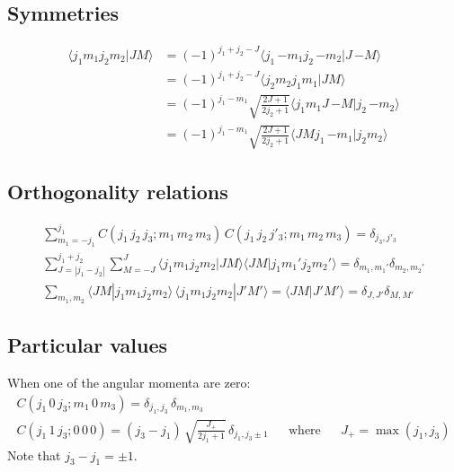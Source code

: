 \subsection{Symmetries}
\label{S:C-G-symm}

\begin{subequations}
  \begin{align}
    \langle j_1 m_1 j_2 m_2|J M\rangle
    \label{Q:C-G-symmetries-1} & = (-1)^{j_1+j_2-J} \langle j_1\, {-m_1} j_2 \, {-m_2}|J \, {-M}\rangle \\
    \label{Q:C-G-symmetries-2} & = (-1)^{j_1+j_2-J} \langle j_2 m_2 j_1 m_1|J M\rangle \\
    \label{Q:C-G-symmetries-3} & = (-1)^{j_1 - m_1} \sqrt{\frac{2 J +1}{2 j_2 +1}}  \langle j_1 m_1 J \, {-M}| j_2\,{-m_2} \rangle \\
    \label{Q:C-G-symmetries-4} & = (-1)^{j_1 - m_1} \sqrt{\frac{2 J +1}{2 j_2 +1}} \langle
    J M j_1 \, {-m_1} | j_2 m_2 \rangle
  \end{align}
\end{subequations}

\subsection{Orthogonality relations}
%
\begin{subequations}
  \begin{align}\label{Q:C-G-orthogonality-0}
    \sum_{m_{1}=-j_{1}}^{j_{1}} C(j_{1} \, j_{2} \, j_{3};m_{1} \, m_{2} \, m_{3}) \,
    C(j_{1} \, j_{2} \, j'_{3};m_{1} \, m_{2} \, m_{3}) =
    \delta_{j_{3},j'_{3}} \\
\label{Q:C-G-orthogonality-1}
    \sum_{J=|j_1-j_2|}^{j_1+j_2} \sum_{M=-J}^{J} \langle j_1 m_1 j_2 m_2|J M\rangle\langle
    J M|j_1 m_1' j_2 m_2'\rangle =
    \delta_{m_1,m_1'}\delta_{m_2,m_2'} \\
    \label{Q:C-G-orthogonality-2} \sum_{m_1, m_2} \langle J M|j_1 m_1 j_2 m_2\rangle \,
    \langle j_1 m_1 j_2 m_2|J' M'\rangle = \langle J M | J' M'\rangle =
    \delta_{J,J'}\delta_{M,M'}
  \end{align}
\end{subequations}


\subsection{Particular values}
\label{S:C-G particular-values}
%
When one of the angular momenta are zero:
\begin{align}
\label{Q:spf1a}
C(j_{1} \, 0 \, j_{3}; m_{1} \,0 \, m_{3}) = \delta_{j_{1},j_{3}} \,
\delta_{m_{1},m_{3}}  &
\\
  \label{Q:C-G-part-val-1}
  C(j_{1} \, 1 \, j_{3}; 0 \,0 \, 0) = (j_{3}-j_{1})\, \sqrt{\frac{J_{+}}{2 j_{1} + 1}} \, \delta_{j_{1},j_{3} \pm 1}& & \text{where} && J_{+} = \max{(j_{1},j_{3})} 
\end{align}
Note that $j_{3}-j_{1} = \pm 1$.

